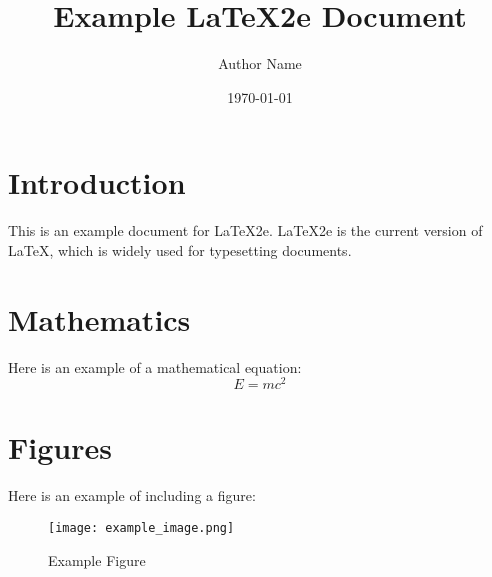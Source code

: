 \documentclass{article}
\title{Example LaTeX2e Document}
\author{Author Name}
\date{\today}
\begin{document}
\maketitle

\section{Introduction}
This is an example document for LaTeX2e. LaTeX2e is the current version of LaTeX, which is widely used for typesetting documents.

\section{Mathematics}
Here is an example of a mathematical equation:
\begin{equation}
E = mc^2
\end{equation}

\section{Figures}
Here is an example of including a figure:
\begin{figure}[h]
\centering
\texttt{[image: example\_image.png]}
\caption{Example Figure}
\end{figure}
\end{document}
